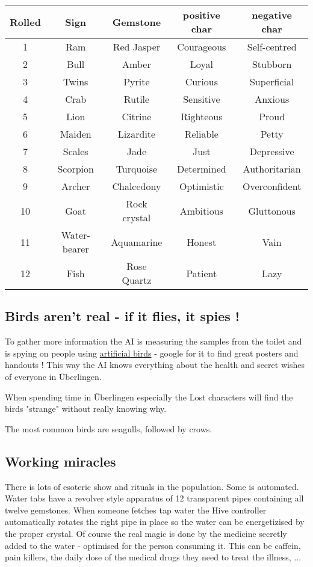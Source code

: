 \begin{tabularx}{\linewidth}{ccccc}
    \hline
    Rolled & Sign & Gemstone & positive char & negative char \\ [0.5ex]
    \hline
    1 & Ram & Red Jasper & Courageous & Self-centred   \\
    2 & Bull & Amber & Loyal & Stubborn   \\
    3 & Twins & Pyrite & Curious & Superficial  \\
    4 & Crab & Rutile & Sensitive & Anxious  \\
    5 & Lion & Citrine & Righteous & Proud  \\
    6 & Maiden & Lizardite & Reliable & Petty  \\
    7 & Scales & Jade & Just & Depressive  \\
    8 & Scorpion & Turquoise & Determined & Authoritarian  \\
    9 & Archer & Chalcedony & Optimistic & Overconfident  \\
    10 & Goat & Rock crystal & Ambitious & Gluttonous  \\
    11 & Water-bearer & Aquamarine & Honest & Vain  \\
    12 & Fish & Rose Quartz & Patient & Lazy  \\
\end{tabularx}

\subsection{Birds aren't real - if it flies, it spies !}

To gather more information the AI is measuring the samples from the toilet and is spying on people using \href{https://en.wikipedia.org/wiki/Birds_Aren%27t_Real}{artificial birds} - google for it to find great posters and handouts !
This way the AI knows everything about the health and secret wishes of everyone in Überlingen.

When spending time in Überlingen especially the Lost characters will find the birds "strange" without really knowing why.

The most common birds are seagulls, followed by crows.

\subsection{Working miracles}

There is lots of esoteric show and rituals in the population. Some is automated. Water tabs have a revolver style apparatus of 12 transparent pipes containing all twelve gemstones. When someone fetches tap water the Hive controller automatically rotates the right pipe in place so the water can be energetizised by the proper crystal.
Of course the real magic is done by the medicine secretly added to the water - optimised for the person consuming it. This can be caffein, pain killers, the daily dose of the medical drugs they need to treat the illness, ...

